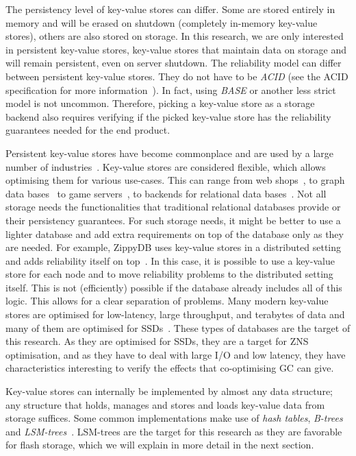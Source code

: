 The persistency level of key-value stores can differ. Some are stored entirely in memory and will be erased on shutdown (completely in-memory key-value stores), others are also stored on storage. In this research, we are only interested in persistent key-value stores, key-value stores that maintain data on storage and will remain persistent, even on server shutdown. The reliability model can differ between persistent key-value stores. They do not have to be \textit{ACID} (see the ACID specification for more information~\cite{rusinkiewicz1995specification}). In fact, using \textit{BASE} or another less strict model is not uncommon. Therefore, picking a key-value store as a storage backend also requires verifying if the picked key-value store has the reliability guarantees needed for the end product.

Persistent key-value stores have become commonplace and are used by a large number of industries~\cite{dong2021evolution, debnath2011skimpystash, risch2015introduction, cao2020characterizing}. Key-value stores are considered flexible, which allows optimising them for various use-cases. This can range from web shops~\cite{risch2015introduction}, to graph data bases~\cite{cao2020characterizing} to game servers~\cite{debnath2011skimpystash}, to backends for relational data bases~\cite{matsunobu2020myrocks}. Not all storage needs the functionalities that traditional relational databases provide or their persistency guarantees. For such storage needs, it might be better to use a lighter database and add extra requirements on top of the database only as they are needed. For example, ZippyDB uses key-value stores in a distributed setting and adds reliability itself on top~\cite{cao2020characterizing}. In this case, it is possible to use a key-value store for each node and to move reliability problems to the distributed setting itself. This is not (efficiently) possible if the database already includes all of this logic. This allows for a clear separation of problems. Many modern key-value stores are optimised for low-latency, large throughput, and terabytes of data and many of them are optimised for SSDs~\cite{doekemeijer2022key}. These types of databases are the target of this research. As they are optimised for SSDs, they are a target for ZNS optimisation, and as they have to deal with large I/O and low latency, they have characteristics interesting to verify the effects that co-optimising GC can give.

Key-value stores can internally be implemented by almost any data structure; any structure that holds, manages and stores and loads key-value data from storage suffices. Some common implementations make use of \textit{hash tables}, \textit{B-trees} and \textit{LSM-trees}~\cite{doekemeijer2022key}. LSM-trees are the target for this research as they are favorable for flash storage, which we will explain in more detail in the next section.

